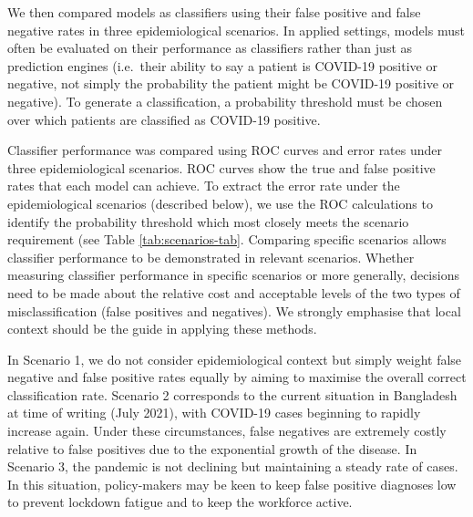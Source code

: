 \documentclass[]{elsarticle} %
\begin{document}
We then compared models as classifiers using their false positive and false negative rates in three epidemiological scenarios.
In applied settings, models must often be evaluated on their performance as classifiers rather than just as prediction engines (i.e.~their ability to say a patient is COVID-19 positive or negative, not simply the probability the patient might be COVID-19 positive or negative).
To generate a classification, a probability threshold must be chosen over which patients are classified as COVID-19 positive.

Classifier performance was compared using ROC curves and error rates under three epidemiological scenarios.
ROC curves show the true and false positive rates that each model can achieve.
To extract the error rate under the epidemiological scenarios (described below), we use the ROC calculations to identify the probability threshold which most closely meets the scenario requirement (see Table \ref{tab:scenarios-tab}.
Comparing specific scenarios allows classifier performance to be demonstrated in relevant scenarios.
Whether measuring classifier performance in specific scenarios or more generally, decisions need to be made about the relative cost and acceptable levels of the two types of misclassification (false positives and negatives).
We strongly emphasise that local context should be the guide in applying these methods.

In Scenario 1, we do not consider epidemiological context but simply weight false negative and false positive rates equally by aiming to maximise the overall correct classification rate.
Scenario 2 corresponds to the current situation in Bangladesh at time of writing (July 2021), with COVID-19 cases beginning to rapidly increase again.
Under these circumstances, false negatives are extremely costly relative to false positives due to the exponential growth of the disease.
In Scenario 3, the pandemic is not declining but maintaining a steady rate of cases.
In this situation, policy-makers may be keen to keep false positive diagnoses low to prevent lockdown fatigue and to keep the workforce active.
\end{document}
